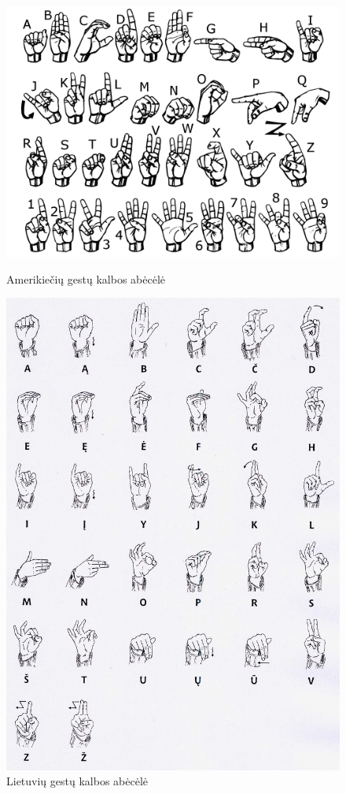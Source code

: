 \documentclass{VUMIFInfKursinis}
\begin{document}
\begin{figure}[H]
	\centering
	\begin{minipage}{.5\textwidth}
		\centering
		\includegraphics[width=.8\linewidth]{img/asl_alphabet}
		\caption[a]{Amerikiečių gestų kalbos abėcėlė\footnotemark}
		\label{img:asl_alphabet}
	\end{minipage}%
	\begin{minipage}{.5\textwidth}
		\centering
		\includegraphics[width=.5\linewidth]{img/lsl_alphabet}
		\caption[b]{Lietuvių gestų kalbos abėcėlė\footnotemark}
		\label{img:lsl_alphabet}
	\end{minipage}
\end{figure}
\end{document}
